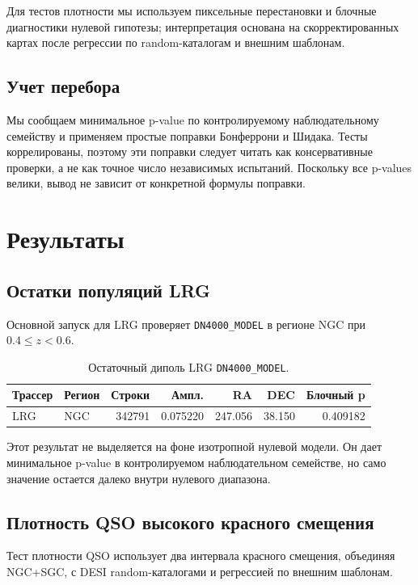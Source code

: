 \documentclass[11pt]{article}
\begin{document}
Для тестов плотности мы используем пиксельные перестановки и блочные диагностики нулевой гипотезы; интерпретация основана на скорректированных картах после регрессии по random-каталогам и внешним шаблонам.

\subsection{Учет перебора}

Мы сообщаем минимальное p-value по контролируемому наблюдательному семейству и применяем простые поправки Бонферрони и Шидака. Тесты коррелированы, поэтому эти поправки следует читать как консервативные проверки, а не как точное число независимых испытаний. Поскольку все p-values велики, вывод не зависит от конкретной формулы поправки.

\section{Результаты}

\subsection{Остатки популяций LRG}

Основной запуск для LRG проверяет \texttt{DN4000\_MODEL} в регионе NGC при $0.4 \le z < 0.6$.

\begin{table}[h]
\centering
\caption{Остаточный диполь LRG \texttt{DN4000\_MODEL}.}
\begin{tabular}{llrrrrr}
\toprule
Трассер & Регион & Строки & Ампл. & RA & DEC & Блочный p \\
\midrule
LRG & NGC & 342791 & 0.075220 & 247.056 & 38.150 & 0.409182 \\
\bottomrule
\end{tabular}
\end{table}

Этот результат не выделяется на фоне изотропной нулевой модели. Он дает минимальное p-value в контролируемом наблюдательном семействе, но само значение остается далеко внутри нулевого диапазона.

\subsection{Плотность QSO высокого красного смещения}

Тест плотности QSO использует два интервала красного смещения, объединяя NGC+SGC, с DESI random-каталогами и регрессией по внешним шаблонам.
\end{document}
